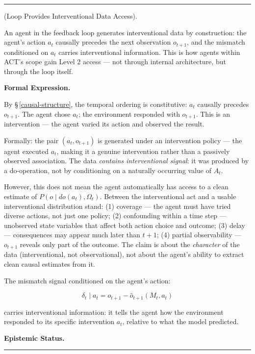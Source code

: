 \documentclass[11pt,oneside]{article}
\newcounter{claim}[section]
\renewcommand{\theclaim}{\thesection.\arabic{claim}}
\newenvironment{segment}[2]{%
  \refstepcounter{claim}%
  \bigskip\noindent\hrule\smallskip
  \noindent{\bfseries #1~\theclaim}\enskip(#2).\par\smallskip
  \noindent\ignorespaces
}{%
  \par\smallskip\noindent\hrule\bigskip
}
\newenvironment{proposition}[1][]{\begin{segment}{Proposition}{#1}}{\end{segment}}
\begin{document}
\begin{proposition}[Loop Provides Interventional Data Access]
\label{loop-interventional-access}
An agent in the feedback loop generates interventional data by construction: the agent's action $a_t$ causally precedes the next observation $o_{t+1}$, and the mismatch conditioned on $a_t$ carries interventional information. This is how agents within ACT's scope gain Level 2 access — not through internal architecture, but through the loop itself.



\medskip\noindent\textbf{Formal Expression.}



By \S\,\ref{causal-structure}, the temporal ordering is constitutive: $a_t$ causally precedes $o_{t+1}$. The agent chose $a_t$; the environment responded with $o_{t+1}$. This is an intervention — the agent varied its action and observed the result.

Formally: the pair $(a_t, o_{t+1})$ is generated under an intervention policy — the agent executed $a_t$, making it a genuine intervention rather than a passively observed association. The data \textit{contains interventional signal}: it was produced by a do-operation, not by conditioning on a naturally occurring value of $A_t$.

However, this does not mean the agent automatically has access to a clean estimate of $P(o \mid do(a_t), \Omega_t)$. Between the interventional act and a usable interventional distribution stand: (1) coverage — the agent must have tried diverse actions, not just one policy; (2) confounding within a time step — unobserved state variables that affect both action choice and outcome; (3) delay — consequences may appear much later than $t+1$; (4) partial observability — $o_{t+1}$ reveals only part of the outcome. The claim is about the \textit{character} of the data (interventional, not observational), not about the agent's ability to extract clean causal estimates from it.

The mismatch signal conditioned on the agent's action:

$$\delta_t \mid a_t = o_{t+1} - \hat{o}_{t+1}(M_t, a_t)$$

carries interventional information: it tells the agent how the environment responded to its specific intervention $a_t$, relative to what the model predicted.


\medskip\noindent\textbf{Epistemic Status.}



\end{proposition}
\end{document}
